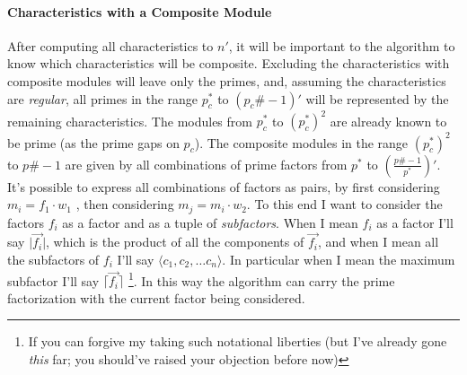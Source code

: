 \documentclass{article}
\begin{document}
\paragraph{Characteristics with a Composite Module}	After computing all characteristics to $n'$, it will be important to the algorithm to know which characteristics will be composite. Excluding the characteristics with composite modules will leave only the primes, and, assuming the characteristics are \emph{regular}, all primes in the range $p_c^*$ to $(p_c\#-1)'$ will be represented by the remaining characteristics. The modules from $p_c^*$ to $(p_c^*)^2$ are already known to be prime (as the prime gaps on $p_c$). The composite modules in the range $(p_c^*)^2$ to $p\#-1$ are given by all combinations of prime factors from $p^*$ to $(\frac{p\#-1}{p^*})'$. It's possible to express all combinations of factors as pairs, by first considering $m_i = f_1 \cdot w_1$ , then considering $m_j = m_i \cdot w_2$. To this end I want to consider the factors $f_i$ as a factor and as a tuple of \emph{subfactors}. When I mean $f_i$ as a factor I'll say $\lvert \vec{f_i} \rvert$, which is the product of all the components of $\vec{f_i}$, and when I mean all the subfactors of $f_i$ I'll say $\langle c_1, c_2, \ldots c_n\rangle$. In particular when I mean the maximum subfactor I'll say $\lceil\vec{f_i}\rceil$ \footnote{If you can forgive my taking such notational liberties (but I've already gone \emph{this} far; you should've raised your objection before now)}. In this way the algorithm can carry the prime factorization with the current factor being considered.

\pagebreak
\end{document}
